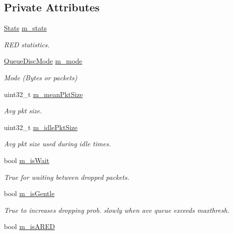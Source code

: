 \subsection*{Private Attributes}
\begin{DoxyCompactItemize}
\item 
\hyperlink{structns3_1_1RedQueueDisc_1_1Stats}{Stats} \hyperlink{classns3_1_1RedQueueDisc_a4175e263cc4c7024d42178190900b1eb}{m\+\_\+stats}
\begin{DoxyCompactList}\small\item\em R\+ED statistics. \end{DoxyCompactList}\item 
\hyperlink{classns3_1_1RedQueueDisc_addca87c9127669da12f19adfe7d14a30}{Queue\+Disc\+Mode} \hyperlink{classns3_1_1RedQueueDisc_aaff7adacb9ec0949e8e867fa27ea6c2c}{m\+\_\+mode}
\begin{DoxyCompactList}\small\item\em Mode (Bytes or packets) \end{DoxyCompactList}\item 
uint32\+\_\+t \hyperlink{classns3_1_1RedQueueDisc_a70edac67edac4ce7c4a7d4325cf1e409}{m\+\_\+mean\+Pkt\+Size}
\begin{DoxyCompactList}\small\item\em Avg pkt size. \end{DoxyCompactList}\item 
uint32\+\_\+t \hyperlink{classns3_1_1RedQueueDisc_ae09362adeaa13f9612b39dc7d76ed2cd}{m\+\_\+idle\+Pkt\+Size}
\begin{DoxyCompactList}\small\item\em Avg pkt size used during idle times. \end{DoxyCompactList}\item 
bool \hyperlink{classns3_1_1RedQueueDisc_a581b90ab14e1387a63b11dd7d03a3e00}{m\+\_\+is\+Wait}
\begin{DoxyCompactList}\small\item\em True for waiting between dropped packets. \end{DoxyCompactList}\item 
bool \hyperlink{classns3_1_1RedQueueDisc_ad9c91813fb21151ac137681a2b1fb0c8}{m\+\_\+is\+Gentle}
\begin{DoxyCompactList}\small\item\em True to increases dropping prob. slowly when ave queue exceeds maxthresh. \end{DoxyCompactList}\item 
bool \hyperlink{classns3_1_1RedQueueDisc_a27b33901dccd8e52d8cbe9798ea70139}{m\+\_\+is\+A\+R\+ED}

\end{DoxyCompactItemize}
